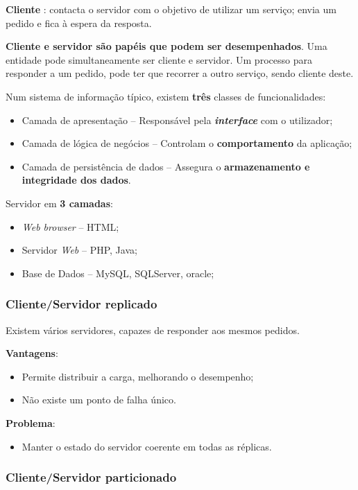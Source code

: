 \documentclass{article}
\begin{document}
\textbf{Cliente} : contacta o servidor com o objetivo de utilizar um serviço; envia um pedido e fica à espera da resposta.

\textbf{Cliente e servidor são papéis que podem ser desempenhados}. Uma entidade pode simultaneamente ser cliente e servidor. Um processo para responder a um pedido, pode ter que recorrer a outro serviço, sendo cliente deste.

Num sistema de informação típico, existem \textbf{três} classes de funcionalidades:

\begin{itemize}
	\item Camada de apresentação -- Responsável pela \textbf{\textit{interface}} com o utilizador;
	\item Camada de lógica de negócios -- Controlam o \textbf{comportamento} da aplicação;
	\item Camada de persistência de dados -- Assegura o \textbf{armazenamento e integridade dos dados}.
\end{itemize}

Servidor em \textbf{3 camadas}:
\begin{itemize}
	\item \textit{Web browser} -- HTML;
	\item Servidor \textit{Web} -- PHP, Java;
	\item Base de Dados -- MySQL, SQLServer, oracle;
\end{itemize}

\subsubsection{Cliente/Servidor \textbf{replicado}}

Existem vários servidores, capazes de responder aos mesmos pedidos.

\textbf{Vantagens}:
\begin{itemize}
	\item Permite distribuir a carga, melhorando o desempenho;
	\item Não existe um ponto de falha único.
\end{itemize}

\textbf{Problema}:
\begin{itemize}
	\item Manter o estado do servidor coerente em todas as réplicas.
\end{itemize}


\subsubsection{Cliente/Servidor \textbf{particionado}}
\end{document}
